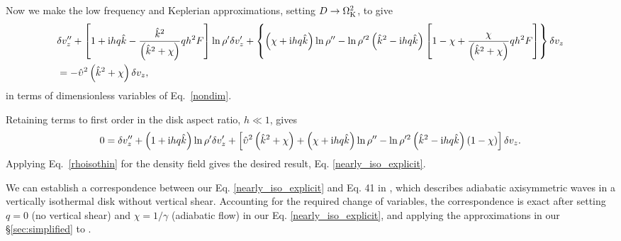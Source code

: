 Now we make the low frequency and Keplerian
approximations, setting $D\to
\Omega_{\rm K}^2$, to give  
\begin{align}
  &\delta v_z ^{\prime\prime} + \left[1 + \mathrm{i} h q\hat{k} -
    \frac{ \hat{k}^2}{
      \left(\hat{k}^2+\chi\right)}q h^2F\right]\ln\rho^{\prime}\delta v_z^\prime +
  \left\{\left(\chi + \mathrm{i} h q
      \hat{k}\right)\ln\rho^{\prime\prime} - \ln\rho^{\prime
      2}\left(\hat{k}^2 -
      \mathrm{i} h
      q\hat{k}\right)\left[1 - \chi +
      \frac{\chi}{\left(\hat{k}^2+\chi\right)}qh^2F\right]\right\}\delta v_z \notag\\&=
  -\hat{\upsilon}^2\left(\hat{k}^2+\chi\right)\delta v_z\label{adia_diso3},
\end{align} 
in terms of dimensionless variables of Eq.\ \ref{nondim}.

Retaining terms to first order in the disk aspect ratio, $h \ll 1$, gives
\begin{align}
  0= \delta v_z ^{\prime\prime} + \left(1 + \mathrm{i} h
     q\hat{k}\right)\ln\rho^{\prime}\delta v_z^\prime 
   +
   \left[\hat{\upsilon}^2\left(\hat{k}^2+\chi\right) +
     \left(  \chi + \mathrm{i} h q\hat{k}\right)\ln\rho^{\prime\prime}
     - \ln\rho^{\prime
       2}\left(\hat{k}^2 -
       \mathrm{i} h
       q\hat{k}\right)\left(1 - \chi\right)\right]\delta v_z.\label{vertiso_gov_nondim}
 \end{align}
Applying Eq.\ \ref{rhoisothin} for the density field gives the desired result, Eq. \ref{nearly_iso_explicit}. 

We can establish a correspondence between our  Eq. \ref{nearly_iso_explicit} and
 Eq. 41 in \cite{lubow93}, which describes adiabatic axisymmetric waves in
a vertically isothermal disk without vertical shear.   Accounting for the required change of variables, 
the correspondence is exact after setting $q=0$ (no vertical shear) and
$\chi=1/\gamma$ (adiabatic flow) in our Eq. \ref{nearly_iso_explicit},
and applying the approximations in our \S \ref{sec:simplified} to \citeauthor{lubow93}.    




      



